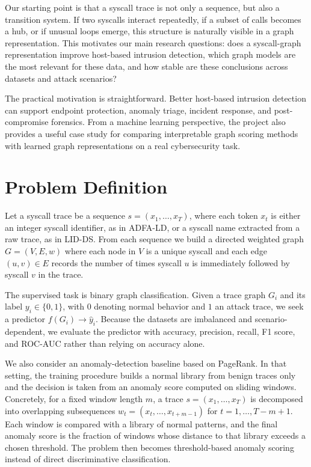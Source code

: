 \documentclass{article}
\begin{document}
Our starting point is that a syscall trace is not only a sequence, but also a transition system. If two syscalls interact repeatedly, if a subset of calls becomes a hub, or if unusual loops emerge, this structure is naturally visible in a graph representation. This motivates our main research questions: does a syscall-graph representation improve host-based intrusion detection, which graph models are the most relevant for these data, and how stable are these conclusions across datasets and attack scenarios?

The practical motivation is straightforward. Better host-based intrusion detection can support endpoint protection, anomaly triage, incident response, and post-compromise forensics. From a machine learning perspective, the project also provides a useful case study for comparing interpretable graph scoring methods with learned graph representations on a real cybersecurity task.



\section{Problem Definition}

Let a syscall trace be a sequence $s=(x_1,\dots,x_T)$, where each token $x_t$ is either an integer syscall identifier, as in ADFA-LD, or a syscall name extracted from a raw trace, as in LID-DS. From each sequence we build a directed weighted graph $G=(V,E,w)$ where each node in $V$ is a unique syscall and each edge $(u,v)\in E$ records the number of times syscall $u$ is immediately followed by syscall $v$ in the trace.

The supervised task is binary graph classification. Given a trace graph $G_i$ and its label $y_i\in\{0,1\}$, with $0$ denoting normal behavior and $1$ an attack trace, we seek a predictor $f(G_i)\rightarrow \hat{y}_i$. Because the datasets are imbalanced and scenario-dependent, we evaluate the predictor with accuracy, precision, recall, F1 score, and ROC-AUC rather than relying on accuracy alone.

We also consider an anomaly-detection baseline based on PageRank. In that setting, the training procedure builds a normal library from benign traces only and the decision is taken from an anomaly score computed on sliding windows. Concretely, for a fixed window length $m$, a trace $s=(x_1,\dots,x_T)$ is decomposed into overlapping subsequences $w_t=(x_t,\dots,x_{t+m-1})$ for $t=1,\dots,T-m+1$. Each window is compared with a library of normal patterns, and the final anomaly score is the fraction of windows whose distance to that library exceeds a chosen threshold. The problem then becomes threshold-based anomaly scoring instead of direct discriminative classification.
\end{document}
